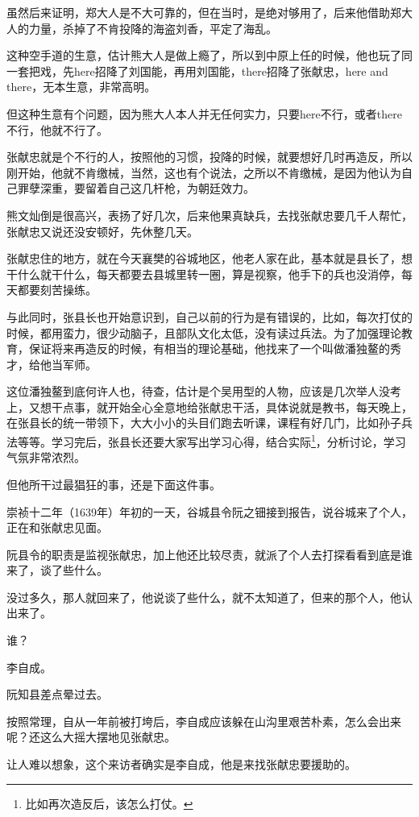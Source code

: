 \begin{multicols}{\theparacolNo}
		虽然后来证明，郑大人是不大可靠的，但在当时，是绝对够用了，后来他借助郑大人的力量，杀掉了不肯投降的海盗刘香，平定了海乱。

		这种空手道的生意，估计熊大人是做上瘾了，所以到中原上任的时候，他也玩了同一套把戏，先here招降了刘国能，再用刘国能，there招降了张献忠，here and there，无本生意，非常高明。

		但这种生意有个问题，因为熊大人本人并无任何实力，只要here不行，或者there不行，他就不行了。

		张献忠就是个不行的人，按照他的习惯，投降的时候，就要想好几时再造反，所以刚开始，他就不肯缴械，当然，这也有个说法，之所以不肯缴械，是因为他认为自己罪孽深重，要留着自己这几杆枪，为朝廷效力。

		熊文灿倒是很高兴，表扬了好几次，后来他果真缺兵，去找张献忠要几千人帮忙，张献忠又说还没安顿好，先休整几天。

		张献忠住的地方，就在今天襄樊的谷城地区，他老人家在此，基本就是县长了，想干什么就干什么，每天都要去县城里转一圈，算是视察，他手下的兵也没消停，每天都要刻苦操练。

		与此同时，张县长也开始意识到，自己以前的行为是有错误的，比如，每次打仗的时候，都用蛮力，很少动脑子，且部队文化太低，没有读过兵法。为了加强理论教育，保证将来再造反的时候，有相当的理论基础，他找来了一个叫做潘独鳌的秀才，给他当军师。

		这位潘独鳌到底何许人也，待查，估计是个吴用型的人物，应该是几次举人没考上，又想干点事，就开始全心全意地给张献忠干活，具体说就是教书，每天晚上，在张县长的统一带领下，大大小小的头目们跑去听课，课程有好几门，比如孙子兵法等等。学习完后，张县长还要大家写出学习心得，结合实际\footnote{比如再次造反后，该怎么打仗。}，分析讨论，学习气氛非常浓烈。

		但他所干过最猖狂的事，还是下面这件事。

		崇祯十二年（1639年）年初的一天，谷城县令阮之钿接到报告，说谷城来了个人，正在和张献忠见面。

		阮县令的职责是监视张献忠，加上他还比较尽责，就派了个人去打探看看到底是谁来了，谈了些什么。

		没过多久，那人就回来了，他说谈了些什么，就不太知道了，但来的那个人，他认出来了。

		谁？

		李自成。

		阮知县差点晕过去。

		按照常理，自从一年前被打垮后，李自成应该躲在山沟里艰苦朴素，怎么会出来呢？还这么大摇大摆地见张献忠。

		让人难以想象，这个来访者确实是李自成，他是来找张献忠要援助的。


\end{multicols}
